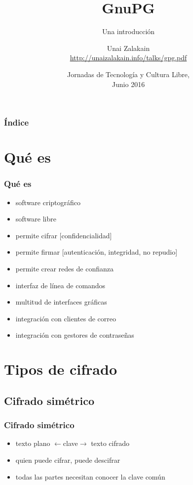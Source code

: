 \documentclass{beamer}
\title{GnuPG}
\subtitle{Una introducción}
\author{Unai Zalakain\\
{\tiny \url{http://unaizalakain.info/talks/gpg.pdf}}}
\date{Jornadas de Tecnología y Cultura Libre,\\ Junio 2016}
\let\olditem\item
\renewcommand{\item}{%
\olditem\vspace{3pt}}
\begin{document}
\frame{\titlepage}

\begin{frame}
\frametitle{Índice}
\tableofcontents
\end{frame}


\section{Qué es}
\begin{frame}
\frametitle{Qué es}
\begin{itemize}
    \item software criptográfico
    \item software libre
    \item permite cifrar [confidencialidad]
    \item permite firmar [autenticación, integridad, no repudio]
    \item permite crear redes de confianza
    \item interfaz de línea de comandos
    \item multitud de interfaces gráficas
    \item integración con clientes de correo
    \item integración con gestores de contraseñas
\end{itemize}
\end{frame}


\section{Tipos de cifrado}
\subsection{Cifrado simétrico}
\begin{frame}
\frametitle{Cifrado simétrico}
\begin{itemize}
    \item texto plano {\tiny $\leftarrow$clave$\rightarrow$} texto cifrado
    \item quien puede cifrar, puede descifrar
    \item todas las partes necesitan conocer la clave común
\end{itemize}
\end{frame}
\end{document}
